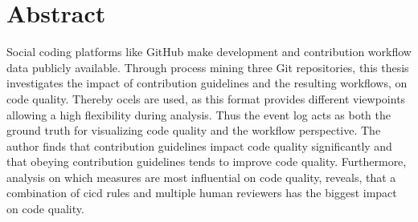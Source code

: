 \chapter*{Abstract}

Social coding platforms like GitHub make development and contribution workflow data publicly available. Through process mining three Git repositories, this thesis investigates the impact of contribution guidelines and the resulting workflows, on code quality. Thereby \acp{ocel} are used, as this format provides different viewpoints allowing a high flexibility during analysis. Thus the event log acts as both the ground truth for visualizing code quality and the workflow perspective. The author finds that contribution guidelines impact code quality significantly and that obeying contribution guidelines tends to improve code quality. Furthermore, analysis on which measures are most influential on code quality, reveals, that a combination of \ac{cicd} rules and multiple human reviewers has the biggest impact on code quality.
